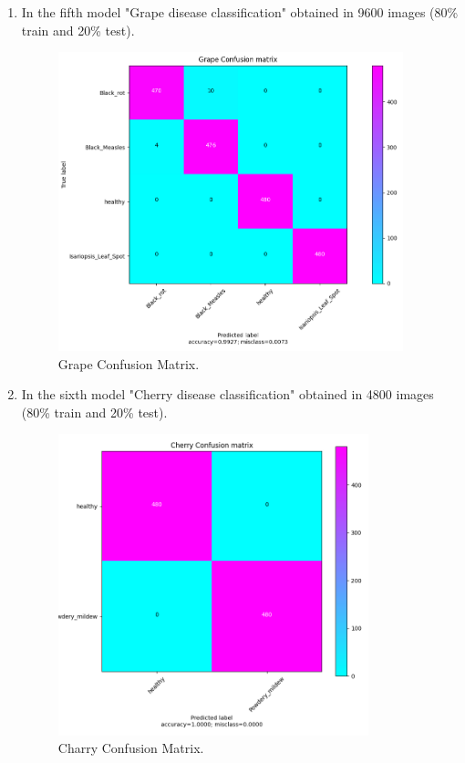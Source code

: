 \begin{enumerate}
  \item In the fifth model "Grape disease classification" obtained in 9600 images (80\% train and 20\% test).
    \begin{figure}[H]
      \centering
      \includegraphics[width=10cm]{photos/chapter05/13.png}
      \caption{Grape Confusion Matrix.}
    \end{figure}

  \item In the sixth model "Cherry disease classification" obtained in 4800 images (80\% train and 20\% test).
    \begin{figure}[H]
      \centering
      \includegraphics[width=9cm]{photos/chapter05/14.png}
      \caption{Charry Confusion Matrix.}
    \end{figure}


\end{enumerate}
